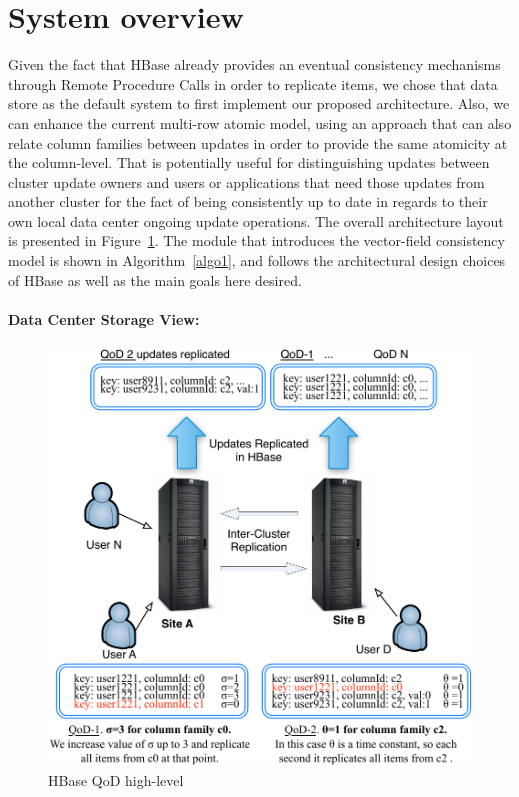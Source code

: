 \section{System overview}\label{architecture:overview}
Given the fact that HBase already provides an eventual consistency mechanisms through Remote Procedure Calls in order to replicate items, we chose that data store as the default system to first implement our proposed architecture. Also, we can enhance the current multi-row atomic model, using an approach that can also relate column families between updates in order to provide the same atomicity at the column-level. That is potentially useful for distinguishing updates between cluster update owners and users or applications that need those updates from another cluster for the fact of being consistently up to date in regards to their own local data center ongoing update operations. The overall architecture layout is presented in Figure~\ref{fig-high-level}. The module that introduces the vector-field consistency model is shown in Algorithm~\ref{algo1}, and follows the architectural design choices of HBase as well as the main goals here desired. 

\paragraph{Data Center Storage View:}

\begin{figure}[t]
\centering
\includegraphics[width=0.8\linewidth]{figs/highlevel.pdf}
\caption{HBase QoD high-level}
\label{fig-high-level}
\end{figure}

